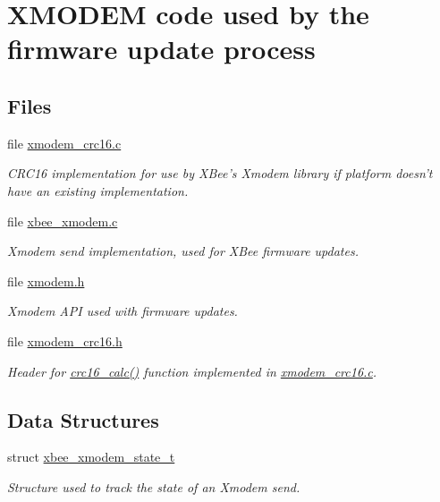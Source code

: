 \hypertarget{group__util__xmodem}{\section{X\-M\-O\-D\-E\-M code used by the firmware update process}
\label{group__util__xmodem}
}
\subsection*{Files}
\begin{DoxyCompactItemize}
\item 
file \hyperlink{xmodem__crc16_8c}{xmodem\-\_\-crc16.\-c}
\begin{DoxyCompactList}\small\item\em C\-R\-C16 implementation for use by X\-Bee's Xmodem library if platform doesn't have an existing implementation. \end{DoxyCompactList}\item 
file \hyperlink{xbee__xmodem_8c}{xbee\-\_\-xmodem.\-c}
\begin{DoxyCompactList}\small\item\em Xmodem send implementation, used for X\-Bee firmware updates. \end{DoxyCompactList}\item 
file \hyperlink{xmodem_8h}{xmodem.\-h}
\begin{DoxyCompactList}\small\item\em Xmodem A\-P\-I used with firmware updates. \end{DoxyCompactList}\item 
file \hyperlink{xmodem__crc16_8h}{xmodem\-\_\-crc16.\-h}
\begin{DoxyCompactList}\small\item\em Header for \hyperlink{group__util__xmodem_ga48b65051c5461be6d016802e2eb8a138}{crc16\-\_\-calc()} function implemented in \hyperlink{xmodem__crc16_8c}{xmodem\-\_\-crc16.\-c}. \end{DoxyCompactList}\end{DoxyCompactItemize}
\subsection*{Data Structures}
\begin{DoxyCompactItemize}
\item 
struct \hyperlink{structxbee__xmodem__state__t}{xbee\-\_\-xmodem\-\_\-state\-\_\-t}
\begin{DoxyCompactList}\small\item\em Structure used to track the state of an Xmodem send. \end{DoxyCompactList}\end{DoxyCompactItemize}
